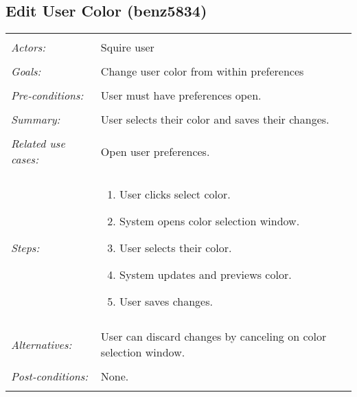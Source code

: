 \subsection{Edit User Color (benz5834)}
\begin{tabular}{ p{2cm} p{12cm} }
 \hline
 \\
 \textit{Actors:} & Squire user \\ 
 \\
 \textit{Goals:} & Change user color from within preferences \\
 \\
 \textit{Pre-conditions:} & User must have preferences open. \\
 \\
 \textit{Summary:} & User selects their color and saves their changes.  \\ 
 \\
 \textit{Related use cases:} & Open user preferences. \\ 
 \\
 \textit{Steps:} & \begin{enumerate}
  \item User clicks select color.
  \item System opens color selection window.
  \item User selects their color.
  \item System updates and previews color.
  \item User saves changes.
 \end{enumerate} \\
 \\
 \textit{Alternatives:} & User can discard changes by canceling on color selection window. \\
 \\
 \textit{Post-conditions:} & None. \\
 \\
\hline
\end{tabular}

